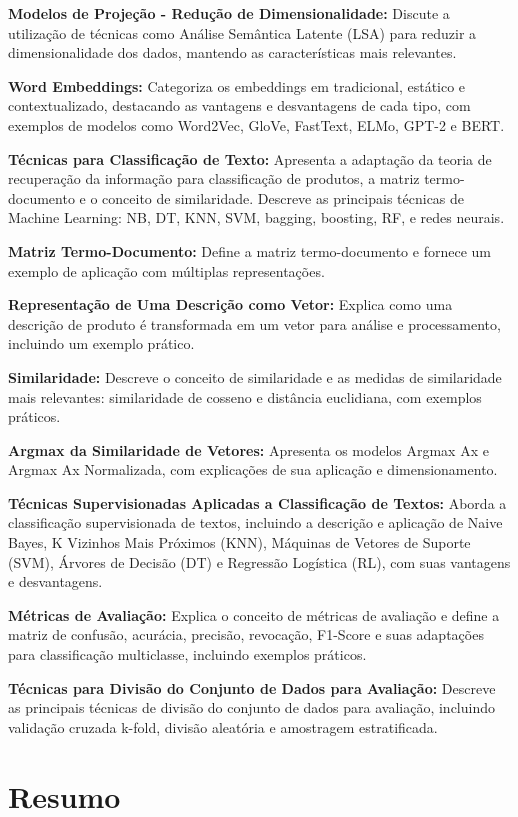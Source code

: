 \documentclass{report}
\begin{document}
\textbf{Modelos de Projeção - Redução de Dimensionalidade:} Discute a utilização de técnicas como Análise Semântica Latente (LSA) para reduzir a dimensionalidade dos dados, mantendo as características mais relevantes.

\textbf{Word Embeddings:} Categoriza os embeddings em tradicional, estático e contextualizado, destacando as vantagens e desvantagens de cada tipo, com exemplos de modelos como Word2Vec, GloVe, FastText, ELMo, GPT-2 e BERT.

\textbf{Técnicas para Classificação de Texto:} Apresenta a adaptação da teoria de recuperação da informação para classificação de produtos, a matriz termo-documento e o conceito de similaridade. Descreve as principais técnicas de Machine Learning: NB, DT, KNN, SVM, bagging, boosting, RF, e redes neurais.

\textbf{Matriz Termo-Documento:} Define a matriz termo-documento e fornece um exemplo de aplicação com múltiplas representações.

\textbf{Representação de Uma Descrição como Vetor:} Explica como uma descrição de produto é transformada em um vetor para análise e processamento, incluindo um exemplo prático.

\textbf{Similaridade:} Descreve o conceito de similaridade e as medidas de similaridade mais relevantes: similaridade de cosseno e distância euclidiana, com exemplos práticos.

\textbf{Argmax da Similaridade de Vetores:} Apresenta os modelos Argmax Ax e Argmax Ax Normalizada, com explicações de sua aplicação e dimensionamento.

\textbf{Técnicas Supervisionadas Aplicadas a Classificação de Textos:} Aborda a classificação supervisionada de textos, incluindo a descrição e aplicação de Naive Bayes, K Vizinhos Mais Próximos (KNN), Máquinas de Vetores de Suporte (SVM), Árvores de Decisão (DT) e Regressão Logística (RL), com suas vantagens e desvantagens.

\textbf{Métricas de Avaliação:} Explica o conceito de métricas de avaliação e define a matriz de confusão, acurácia, precisão, revocação, F1-Score e suas adaptações para classificação multiclasse, incluindo exemplos práticos.

\textbf{Técnicas para Divisão do Conjunto de Dados para Avaliação:} Descreve as principais técnicas de divisão do conjunto de dados para avaliação, incluindo validação cruzada k-fold, divisão aleatória e amostragem estratificada.

\section*{Resumo}
\end{document}
